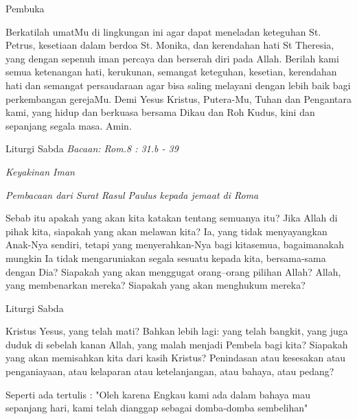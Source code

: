 \documentclass[12pt,a4paper]{beamer}
\begin{document}
\begin{frame}{Pembuka}
\begin{description}[1cm]
\item [U] Berkatilah umatMu di lingkungan ini agar dapat meneladan keteguhan St. Petrus, kesetiaan dalam berdoa St. Monika, dan kerendahan hati St Theresia, yang dengan sepenuh iman percaya dan berserah diri pada Allah. Berilah kami semua ketenangan hati, kerukunan, semangat keteguhan, kesetian, kerendahan hati dan semangat persaudaraan agar bisa saling melayani dengan lebih baik bagi perkembangan gerejaMu. Demi Yesus Kristus, Putera-Mu, Tuhan dan Pengantara kami, yang hidup dan berkuasa bersama Dikau dan Roh Kudus, kini dan sepanjang segala masa. Amin.

\end{description}
\end{frame}

\begin{frame}{Liturgi Sabda}
\textit{Bacaan: Rom.8 : 31.b - 39}

\textit{Keyakinan Iman}

\begin{description}[1cm]
\item [P] \textit{Pembacaan dari Surat Rasul Paulus kepada jemaat di Roma }

      Sebab itu apakah yang akan kita katakan tentang semuanya itu? Jika Allah di pihak kita, siapakah yang akan melawan kita? Ia, yang tidak menyayangkan Anak-Nya sendiri, tetapi yang menyerahkan-Nya bagi kitasemua, bagaimanakah mungkin Ia tidak mengaruniakan segala sesuatu kepada kita, bersama-sama dengan Dia? Siapakah yang akan menggugat orang--orang pilihan Allah? Allah, yang membenarkan mereka? Siapakah yang akan menghukum mereka? 
\end{description}      
\end{frame}

\begin{frame}{Liturgi Sabda}
\begin{description}[1cm]

\item Kristus Yesus, yang telah mati? Bahkan lebih lagi: yang telah bangkit, yang juga duduk  di sebelah kanan Allah, yang malah menjadi Pembela bagi kita? Siapakah yang akan memisahkan kita dari kasih Kristus? Penindasan atau kesesakan atau penganiayaan, atau kelaparan atau ketelanjangan, atau bahaya, atau pedang? 
      
      Seperti ada tertulis :
"Oleh karena Engkau kami ada dalam bahaya mau sepanjang hari, kami telah dianggap sebagai domba-domba sembelihan"
\end{description}

\end{frame}
\end{document}
